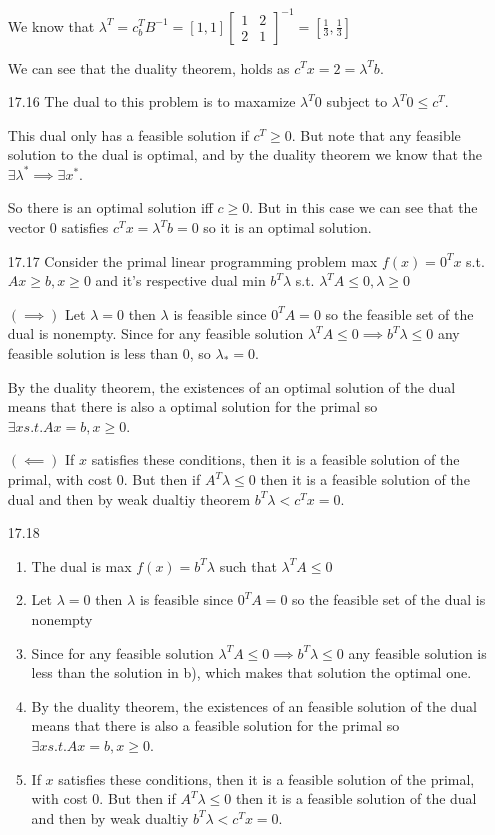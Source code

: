 \documentclass[10pt,a4paper]{article}
\newcommand\m[1]{\begin{bmatrix}#1\end{bmatrix}}
\begin{document}
\begin{enumerate}
   We know that $\lambda^T = c_b^T B^{-1} = [1, 1]\m{1 & 2 \\ 2 & 1}^{-1} = [\frac{1}{3}, \frac{1}{3}]$

   We can see that the duality theorem, holds as $c^Tx = 2 = \lambda^Tb$.

    \item [17.16] The dual to this problem is to maxamize $\lambda^T0$ subject to $\lambda^T0 \leq c^T$. 
    
    This dual only has a feasible solution if $c^T \geq 0$. But note that any feasible solution to the dual is optimal, and by the duality theorem we know that the $\exists \lambda^* \implies \exists x^*$. 
    
    So there is an optimal solution iff $c \geq0$. But in this case we can see that the vector $0$ satisfies $c^Tx = \lambda^Tb = 0$ so it is an optimal solution.

    \item [17.17] Consider the primal linear programming problem max $f(x) = 0^Tx$ s.t. $Ax \geq b, x \geq 0$ and it's respective dual min $b^T\lambda$ s.t. $\lambda^TA \leq 0, \lambda \geq 0$
    
        $(\implies)$ Let $\lambda = 0$ then $\lambda$ is feasible since $0^TA = 0$ so the feasible set of the dual is nonempty.
        Since for any feasible solution $\lambda^T A \leq 0 \implies b^T\lambda \leq 0$ any feasible solution is less than 0, so $\lambda_* = 0$.

        By the duality theorem, the existences of an optimal solution of the dual means that there is also a optimal solution for the primal so $\exists x s.t. Ax =b, x\geq 0$. 

        $(\impliedby)$ If $x$ satisfies these conditions, then it is a feasible solution of the primal, with cost $0$. But then if $A^T \lambda \leq 0$ then it is a feasible solution of the dual and then by weak dualtiy theorem $b^T\lambda < c^Tx = 0$.
    

    \item [17.18] \begin{enumerate}
        \item The dual is max $f(x) = b^T\lambda$ such that $\lambda^T A \leq 0$
        \item Let $\lambda = 0$ then $\lambda$ is feasible since $0^TA = 0$ so the feasible set of the dual is nonempty
        \item Since for any feasible solution $\lambda^T A \leq 0 \implies b^T\lambda \leq 0$ any feasible solution is less than the solution in b), which makes that solution the optimal one.
        \item By the duality theorem, the existences of an feasible solution of the dual means that there is also a feasible solution for the primal so $\exists x s.t. Ax =b, x\geq 0$. 
        \item If $x$ satisfies these conditions, then it is a feasible solution of the primal, with cost $0$. But then if $A^T \lambda \leq 0$ then it is a feasible solution of the dual and then by weak dualtiy $b^T\lambda < c^Tx = 0$.
    \end{enumerate}


\end{enumerate}
\end{document}

